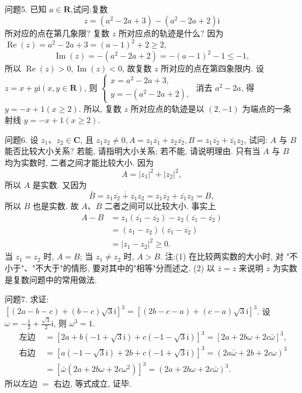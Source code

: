 问题5. 已知 $a \in \mathbf{R}$,试问:复数
$$
z=\left(a^2-2 a+3\right)-\left(a^2-2 a+2\right) \mathrm{i}
$$
所对应的点在第几象限? 复数 $z$ 所对应点的轨迹是什么?
因为 $\operatorname{Re}(z)=a^2-2 a+3=(a-1)^2+2 \geqslant 2$,
$$
\operatorname{Im}(z)=-\left(a^2-2 a+2\right)=-(a-1)^2-1 \leqslant-1,
$$
所以 $\operatorname{Re}(z)>0, \operatorname{Im}(z)<0$, 故复数 $z$ 所对应的点在第四象限内.
设 $z=x+y \mathrm{i}(x, y \in \mathbf{R})$, 则 $\left\{\begin{array}{l}x=a^2-2 a+3, \\ y=-\left(a^2-2 a+2\right),\end{array}\right.$ 消去 $a^2-2 a$, 得 $y= -x+1(x \geqslant 2)$.
所以, 复数 $z$ 所对应点的轨迹是以 $(2,-1)$ 为端点的一条射线 $y=-x+ 1(x \geqslant 2)$.



问题6. 设 $z_1 、 z_2 \in \mathbf{C}$, 且 $z_1 z_2 \neq 0, A=z_1 \overline{z_1}+z_2 \overline{z_2}, B=z_1 \overline{z_2}+\overline{z_1} z_2$, 试问: $A$ 与 $B$ 能否比较大小关系? 若能, 请指明大小关系; 若不能, 请说明理由.
只有当 $A$ 与 $B$ 均为实数时, 二者之间才能比较大小.
因为
$$
A=\left|z_1\right|^2+\left|z_2\right|^2,
$$
所以 $A$ 是实数.
又因为
$$
\bar{B}=\overline{z_1 \overline{z_2}+\overline{z_1} z_2}=z_1 \overline{z_2}+\overline{z_1} z_2=B,
$$
所以 $B$ 也是实数.
故 $A 、 B$ 二者之间可以比较大小.
事实上
$$
\begin{aligned}
A-B & =z_1\left(\overline{z_1}-\overline{z_2}\right)-z_2\left(\overline{z_1}-\overline{z_2}\right) \\
& =\left(z_1-z_2\right)\left(\overline{z_1}-\overline{z_2}\right) \\
& =\left|z_1-z_2\right|^2 \geqslant 0 .
\end{aligned}
$$
当 $z_1=z_2$ 时, $A=B$;
当 $z_1 \neq z_2$ 时, $A>B$.
注:(1) 在比较两实数的大小时, 对 "不小于"、"不大于"的情形, 要对其中的"相等"分而述之.
(2) 以 $\bar{z}=z$ 来说明 $z$ 为实数是复数问题中的常用做法.



问题7. 求证: $[(2 a-b-c)+(b-c) \sqrt{3} \mathrm{i}]^3=[(2 b-c-a)+(c-a) \sqrt{3} \mathrm{i}]^3$.
设 $\omega=-\frac{1}{2}+\frac{\sqrt{3}}{2} \mathrm{i}$, 则 $\omega^3=1$.
$$
\begin{aligned}
\text { 左边 } & =[2 a+b(-1+\sqrt{3} \mathrm{i})+c(-1-\sqrt{3} \mathrm{i})]^3=[2 a+2 b \omega+2 c \bar{\omega}]^3, \\
\text { 右边 } & =[a(-1-\sqrt{3} \mathrm{i})+2 b+c(-1+\sqrt{3} \mathrm{i})]^3=(2 a \bar{\omega}+2 b+2 c \omega)^3 \\
& =\left[\bar{\omega}\left(2 a+2 b \omega+2 c \omega^2\right)\right]^3=(2 a+2 b \omega+2 c \bar{\omega})^3 .
\end{aligned}
$$
所以左边 $=$ 右边, 等式成立, 证毕.


